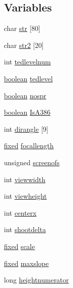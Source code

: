 \subsection*{Variables}
\begin{DoxyCompactItemize}
\item 
char \hyperlink{WL__MAIN_8C_aaa970ecb4bbdf1eeaf97691045aaf8b5}{str} \mbox{[}80\mbox{]}
\item 
char \hyperlink{WL__MAIN_8C_ab4ccbbd4c1a8a1618dcdfede0c63d313}{str2} \mbox{[}20\mbox{]}
\item 
int \hyperlink{WL__MAIN_8C_aecad4308d4e4f895479ae314b36ecadb}{tedlevelnum}
\item 
\hyperlink{ID__HEAD_8H_a7c6368b321bd9acd0149b030bb8275ed}{boolean} \hyperlink{WL__MAIN_8C_ae4f570f74d8fa87a5c00a8ebb38dbbd5}{tedlevel}
\item 
\hyperlink{ID__HEAD_8H_a7c6368b321bd9acd0149b030bb8275ed}{boolean} \hyperlink{WL__MAIN_8C_a6910c9b4b0337ce17f4ea6c2260721bf}{nospr}
\item 
\hyperlink{ID__HEAD_8H_a7c6368b321bd9acd0149b030bb8275ed}{boolean} \hyperlink{WL__MAIN_8C_ae705b06258eb47aefcfc554d1e2e0a3b}{IsA386}
\item 
int \hyperlink{WL__MAIN_8C_a3a80e8be3138f31dfac72bcf50a43d62}{dirangle} \mbox{[}9\mbox{]}
\item 
\hyperlink{WL__DEF_8H_aaf54715c9b83afe8794059fcf5fd5e7e}{fixed} \hyperlink{WL__MAIN_8C_a288677cce66771feddc15ea8cc5c36cc}{focallength}
\item 
unsigned \hyperlink{WL__MAIN_8C_abcc8c237b97739d0b0c39acc08dbf2fc}{screenofs}
\item 
int \hyperlink{WL__MAIN_8C_a9d8a9239749c5174f26cf73ab9625c3b}{viewwidth}
\item 
int \hyperlink{WL__MAIN_8C_abbbcb01b7dcc4679d07cde1acfbf1412}{viewheight}
\item 
int \hyperlink{WL__MAIN_8C_a05f5f2b9130da8655f373530b17559f2}{centerx}
\item 
int \hyperlink{WL__MAIN_8C_aa63bb3fda19e484f4cbc31ad1760f408}{shootdelta}
\item 
\hyperlink{WL__DEF_8H_aaf54715c9b83afe8794059fcf5fd5e7e}{fixed} \hyperlink{WL__MAIN_8C_a849bfcd0a34b52dc70d3d9fa35a9ffc7}{scale}
\item 
\hyperlink{WL__DEF_8H_aaf54715c9b83afe8794059fcf5fd5e7e}{fixed} \hyperlink{WL__MAIN_8C_ab4bad4ff8262f2f964b36bb50a8f890c}{maxslope}
\item 
long \hyperlink{WL__MAIN_8C_aebfb0db84258aa5fc9301a200f96b8d3}{heightnumerator}
\item 

\end{DoxyCompactItemize}
